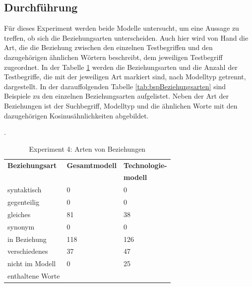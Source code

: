 \documentclass[12pt,a4paper]{report}
\begin{document}
		\subsection*{Durchführung}
		Für dieses Experiment werden beide Modelle untersucht, um eine Aussage zu treffen, ob sich die Beziehungsarten unterscheiden. Auch hier wird von Hand die Art, die die Beziehung zwischen den einzelnen Testbegriffen und den dazugehörigen ähnlichen Wörtern beschreibt, dem jeweiligen Testbegriff zugeordnet. In der Tabelle \ref{tab:experiment4} werden die Beziehungsarten und die Anzahl der Testbegriffe, die mit der jeweiligen Art markiert sind, nach Modelltyp getrennt, dargestellt. In der darauffolgenden Tabelle \ref{tab:bspBeziehungsarten} sind Beispiele zu den einzelnen Beziehungsarten aufgelistet. Neben der Art der Beziehungen ist der Suchbegriff, Modelltyp und die ähnlichen Worte mit den dazugehörigen Kosinusähnlichkeiten abgebildet.
		
		.\\
		
\begin{table}[H]
\caption{Experiment 4: Arten von Beziehungen}
\label{tab:experiment4}
\begin{center}
\begin{tabular}{|l||l|l|}
\hline
\textbf{Beziehungsart}	& \textbf{Gesamtmodell}	&   \textbf{Technologie-}   \\
 				&  				   & \textbf{modell}		 \\

\hline
 syntaktisch & 0 	& 0 \\
 \hline
 gegenteilig & 0 	& 0  \\
 \hline
 gleiches & 81 	& 38  \\
 \hline
 synonym & 0 	& 0  \\
 \hline
 in Beziehung & 118 	& 126 \\
 \hline
 verschiedenes & 37	& 47 \\
 \hline
 nicht im Modell & 0  & 25  \\
 enthaltene Worte &   &\\
 \hline
 
\end{tabular}
\end{center}
\end{table}
		
		
\end{document}
